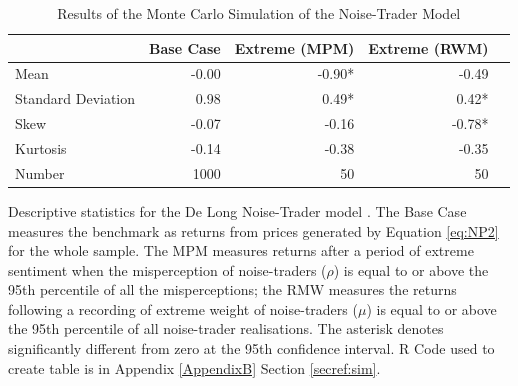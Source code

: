 \documentclass[12pt, a4paper, oneside]{article} %
\begin{document}
\begin{table}[h!]
\begin{threeparttable}
\caption{Results of the Monte Carlo Simulation of the Noise-Trader Model}
\begin{tabular}{p{6cm} | r r r r}
 \label{tabref:MC1}
                            & Base Case  & Extreme (MPM) & Extreme (RWM) \\
  \hline
\hline
Mean                     & -0.00 & -0.90*   & -0.49 \\
Standard Deviation  & 0.98 &  0.49*     &  0.42*\\
Skew                      &  -0.07 &  -0.16   &  -0.78*\\
Kurtosis                  &  -0.14 &  -0.38    &  -0.35\\
Number                 &  1000        &   50        & 50\\

\end{tabular}
\begin{tablenotes}
\small
\item Descriptive statistics for the De Long Noise-Trader model \citep{Delong1990noise}.  The Base Case measures the benchmark as returns from prices generated by Equation \ref{eq:NP2} for the whole sample.   The MPM measures returns after a period of extreme sentiment when the misperception of noise-traders ($\rho$) is equal to or above the 95th percentile of all the misperceptions; the RMW measures the returns following a recording of extreme weight of noise-traders ($\mu$) is equal to or above the 95th percentile of all noise-trader realisations.   The asterisk denotes significantly different from zero at the 95th confidence interval.   R Code used to create table is in Appendix \ref{AppendixB} Section \ref{secref:sim}. 
\end{tablenotes}
\end{threeparttable}
\end{table}

\end{document}
